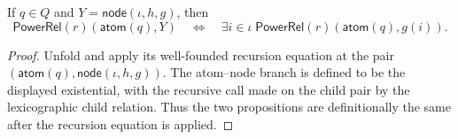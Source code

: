 \begin{lemma}
If $q\in Q$ and $Y=\mathsf{node}(\iota,h,g)$, then
\[
\mathsf{PowerRel}(r)(\mathsf{atom}(q),Y)
\quad\Longleftrightarrow\quad
\exists i\in\iota\;\mathsf{PowerRel}(r)(\mathsf{atom}(q),g(i)).
\]
\end{lemma}
\begin{proof}
Unfold  and apply its well-founded recursion equation at
the pair $(\mathsf{atom}(q),\mathsf{node}(\iota,h,g))$.  The atom--node
branch is defined to be the displayed existential, with the recursive call
made on the child pair by the lexicographic child relation.  Thus the two
propositions are definitionally the same after the recursion equation is
applied.
\end{proof}
